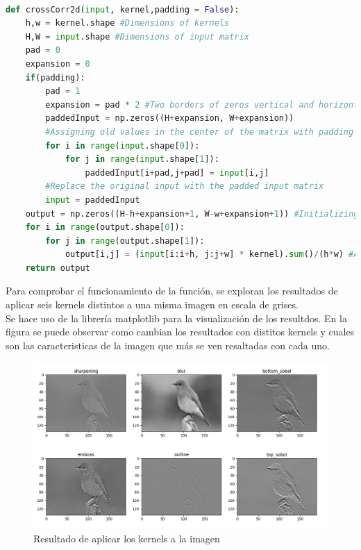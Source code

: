 \documentclass{article}
\begin{document}
$$\begin{lstlisting}[language=python]
def crossCorr2d(input, kernel,padding = False):
    h,w = kernel.shape #Dimensions of kernels
    H,W = input.shape #Dimensions of input matrix
    pad = 0
    expansion = 0
    if(padding):
        pad = 1
        expansion = pad * 2 #Two borders of zeros vertical and horizontal
        paddedInput = np.zeros((H+expansion, W+expansion))
        #Assigning old values in the center of the matrix with padding
        for i in range(input.shape[0]):
            for j in range(input.shape[1]):
                paddedInput[i+pad,j+pad] = input[i,j]
        #Replace the original input with the padded input matrix
        input = paddedInput
    output = np.zeros((H-h+expansion+1, W-w+expansion+1)) #Initializing new matrix
    for i in range(output.shape[0]):
        for j in range(output.shape[1]):
            output[i,j] = (input[i:i+h, j:j+w] * kernel).sum()/(h*w) #Asigning cross correlation operations
    return output
\end{lstlisting} 
Para comprobar el funcionamiento de la función, se exploran los resultados de aplicar seis kernels distintos a una misma imagen en escala de grises.  \\
Se hace uso de la librería matplotlib para la visualización de los resultdos. En la figura se puede observar como cambian los resultados con distitos kernels y cuales son las 
caracteristicas de la imagen que más se ven resaltadas con cada uno. 
\begin{figure}[H]
    \centering
    \includegraphics[width=180mm]{bird.png}
    \caption{Resultado de aplicar los kernels a la imagen}
    \label{bird}
\end{figure}
\end{document}
